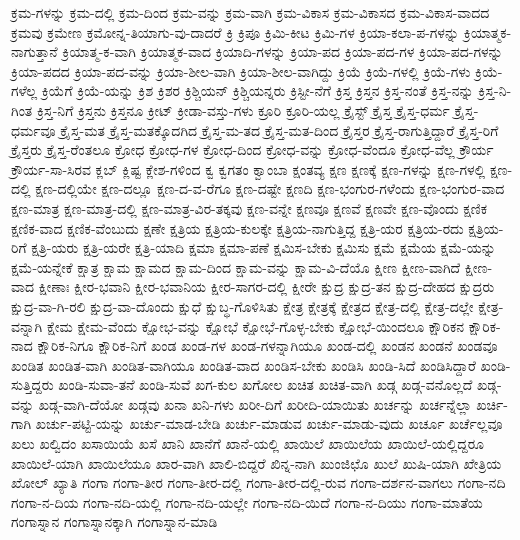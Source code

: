 {ಕ್ರಮ-ಗಳನ್ನು
ಕ್ರಮ-ದಲ್ಲಿ
ಕ್ರಮ-ದಿಂದ
ಕ್ರಮ-ವನ್ನು
ಕ್ರಮ-ವಾಗಿ
ಕ್ರಮ-ವಿಕಾಸ
ಕ್ರಮ-ವಿಕಾಸದ
ಕ್ರಮ-ವಿಕಾಸ-ವಾದದ
ಕ್ರಮವು
ಕ್ರಮೇಣ
ಕ್ರಮೋನ್ನ-ತಿಯಾಗು-ವು-ದಾದರೆ
ಕ್ರಿ
ಕ್ರಿಪೂ
ಕ್ರಿಮಿ-ಕೀಟ
ಕ್ರಿಮಿ-ಗಳ
ಕ್ರಿಯಾ-ಕಲಾ-ಪ-ಗಳನ್ನು
ಕ್ರಿಯಾತ್ಮಕ-ನಾಗುತ್ತಾನೆ
ಕ್ರಿಯಾತ್ಮ-ಕ-ವಾಗಿ
ಕ್ರಿಯಾತ್ಮಕ-ವಾದ
ಕ್ರಿಯಾದಿ-ಗಳನ್ನು
ಕ್ರಿಯಾ-ಪದ
ಕ್ರಿಯಾ-ಪದ-ಗಳ
ಕ್ರಿಯಾ-ಪದ-ಗಳನ್ನು
ಕ್ರಿಯಾ-ಪದದ
ಕ್ರಿಯಾ-ಪದ-ವನ್ನು
ಕ್ರಿಯಾ-ಶೀಲ-ವಾಗಿ
ಕ್ರಿಯಾ-ಶೀಲ-ವಾಗಿದ್ದು
ಕ್ರಿಯೆ
ಕ್ರಿಯೆ-ಗಳಲ್ಲಿ
ಕ್ರಿಯೆ-ಗಳು
ಕ್ರಿಯೆ-ಗಳೆಲ್ಲ
ಕ್ರಿಯೆಗೆ
ಕ್ರಿಯೆ-ಯನ್ನು
ಕ್ರಿಶ
ಕ್ರಿಶರ
ಕ್ರಿಶ್ಚಿಯನ್
ಕ್ರಿಶ್ಚಿಯನ್ನರು
ಕ್ರಿಸ್ಟೀ-ನೆಗೆ
ಕ್ರಿಸ್ತ
ಕ್ರಿಸ್ತನ
ಕ್ರಿಸ್ತ-ನಂತೆ
ಕ್ರಿಸ್ತ-ನನ್ನು
ಕ್ರಿಸ್ತ-ನಿ-ಗಿಂತ
ಕ್ರಿಸ್ತ-ನಿಗೆ
ಕ್ರಿಸ್ತನು
ಕ್ರಿಸ್ತನೂ
ಕ್ರೀಟ್
ಕ್ರೀಡಾ-ವಸ್ತು-ಗಳು
ಕ್ರೂರಿ
ಕ್ರೂರಿ-ಯಲ್ಲ
ಕ್ರೈಸ್ಟ್
ಕ್ರೈಸ್ತ
ಕ್ರೈಸ್ತ-ಧರ್ಮ
ಕ್ರೈಸ್ತ-ಧರ್ಮವೂ
ಕ್ರೈಸ್ತ-ಮತ
ಕ್ರೈಸ್ತ-ಮತಕ್ಕೊದಗಿದ
ಕ್ರೈಸ್ತ-ಮ-ತದ
ಕ್ರೈಸ್ತ-ಮತ-ದಿಂದ
ಕ್ರೈಸ್ತರ
ಕ್ರೈಸ್ತ-ರಾಗುತ್ತಿದ್ದಾರೆ
ಕ್ರೈಸ್ತ-ರಿಗೆ
ಕ್ರೈಸ್ತರು
ಕ್ರೈಸ್ತ-ರೆಂತಲೂ
ಕ್ರೋಧ
ಕ್ರೋಧ-ಗಳ
ಕ್ರೋಧ-ದಿಂದ
ಕ್ರೋಧ-ವನ್ನು
ಕ್ರೋಧ-ವೆಂದೂ
ಕ್ರೋಧ-ವೆಲ್ಲ
ಕ್ರೌರ್ಯ
ಕ್ರೌರ್ಯ-ಸಾ-ಸಿರವ
ಕ್ಲಬ್
ಕ್ಲಿಷ್ಟ
ಕ್ಲೇಶ-ಗಳಿಂದ
ಕ್ವ
ಕ್ವಗತಂ
ಕ್ವಾಂಬಾ
ಕ್ಷಂತವ್ಯ
ಕ್ಷಣ
ಕ್ಷಣಕ್ಕೆ
ಕ್ಷಣ-ಗಳನ್ನು
ಕ್ಷಣ-ಗಳಲ್ಲಿ
ಕ್ಷಣ-ದಲ್ಲಿ
ಕ್ಷಣ-ದಲ್ಲಿಯೇ
ಕ್ಷಣ-ದಲ್ಲೂ
ಕ್ಷಣ-ದ-ವ-ರೆಗೂ
ಕ್ಷಣ-ದಷ್ಟೇ
ಕ್ಷಣದಿ
ಕ್ಷಣ-ಭಂಗುರ-ಗಳೆಂದು
ಕ್ಷಣ-ಭಂಗುರ-ವಾದ
ಕ್ಷಣ-ಮಾತ್ರ
ಕ್ಷಣ-ಮಾತ್ರ-ದಲ್ಲಿ
ಕ್ಷಣ-ಮಾತ್ರ-ವಿರ-ತಕ್ಕವು
ಕ್ಷಣ-ವನ್ನೇ
ಕ್ಷಣವೂ
ಕ್ಷಣವೆ
ಕ್ಷಣವೇ
ಕ್ಷಣ-ವೊಂದು
ಕ್ಷಣಿಕ
ಕ್ಷಣಿಕ-ವಾದ
ಕ್ಷಣಿಕ-ವೆಂಬುದು
ಕ್ಷಣೇ
ಕ್ಷತ್ರಿಯ
ಕ್ಷತ್ರಿಯ-ಕುಲಕ್ಕೇ
ಕ್ಷತ್ರಿಯ-ನಾಗುತ್ತಿದ್ದ
ಕ್ಷತ್ರಿ-ಯರ
ಕ್ಷತ್ರಿಯ-ರದು
ಕ್ಷತ್ರಿಯ-ರಿಗೆ
ಕ್ಷತ್ರಿ-ಯರು
ಕ್ಷತ್ರಿ-ಯರೇ
ಕ್ಷತ್ರಿ-ಯಾದಿ
ಕ್ಷಮಾ
ಕ್ಷಮಾ-ಪಣೆ
ಕ್ಷಮಿಸ-ಬೇಕು
ಕ್ಷಮಿಸು
ಕ್ಷಮೆ
ಕ್ಷಮೆಯ
ಕ್ಷಮೆ-ಯನ್ನು
ಕ್ಷಮೆ-ಯನ್ನೇಕೆ
ಕ್ಷಾತ್ರ
ಕ್ಷಾಮ
ಕ್ಷಾಮದ
ಕ್ಷಾಮ-ದಿಂದ
ಕ್ಷಾಮ-ವನ್ನು
ಕ್ಷಾಮ-ವಿ-ದೆಯೊ
ಕ್ಷೀಣ
ಕ್ಷೀಣ-ವಾಗಿದೆ
ಕ್ಷೀಣ-ವಾದ
ಕ್ಷೀಣಾಃ
ಕ್ಷೀರ-ಭವಾನಿ
ಕ್ಷೀರ-ಭವಾನಿಯ
ಕ್ಷೀರ-ಸಾಗರ-ದಲ್ಲಿ
ಕ್ಷೀರೇ
ಕ್ಷುದ್ರ
ಕ್ಷುದ್ರ-ತನ
ಕ್ಷುದ್ರ-ದೇಹದ
ಕ್ಷುದ್ರರು
ಕ್ಷುದ್ರ-ವಾ-ಗಿ-ರಲಿ
ಕ್ಷುದ್ರ-ವಾ-ದೊಂದು
ಕ್ಷುಧೆ
ಕ್ಷುಬ್ಧ-ಗೊಳಿಸಿತು
ಕ್ಷೇತ್ರ
ಕ್ಷೇತ್ರಕ್ಕೆ
ಕ್ಷೇತ್ರದ
ಕ್ಷೇತ್ರ-ದಲ್ಲಿ
ಕ್ಷೇತ್ರ-ದಲ್ಲೇ
ಕ್ಷೇತ್ರ-ವನ್ನಾಗಿ
ಕ್ಷೇಮ
ಕ್ಷೇಮ-ವೆಂದು
ಕ್ಷೋಭ-ವನ್ನು
ಕ್ಷೋಭೆ
ಕ್ಷೋಭೆ-ಗೊಳ್ಳ-ಬೇಕು
ಕ್ಷೋಭೆ-ಯಿಂದಲೂ
ಕ್ಷೌರಿಕನ
ಕ್ಷೌರಿಕ-ನಾದ
ಕ್ಷೌರಿಕ-ನಿಗೂ
ಕ್ಷೌರಿಕ-ನಿಗೆ
ಖಂಡ
ಖಂಡ-ಗಳ
ಖಂಡ-ಗಳನ್ನಾಗಿಯೂ
ಖಂಡ-ದಲ್ಲಿ
ಖಂಡನ
ಖಂಡನೆ
ಖಂಡವೂ
ಖಂಡಿತ
ಖಂಡಿತ-ವಾಗಿ
ಖಂಡಿತ-ವಾಗಿಯೂ
ಖಂಡಿತ-ವಾದ
ಖಂಡಿಸ-ಬೇಕು
ಖಂಡಿಸಿ
ಖಂಡಿ-ಸಿದೆ
ಖಂಡಿಸಿದ್ದಾರೆ
ಖಂಡಿ-ಸುತ್ತಿದ್ದರು
ಖಂಡಿ-ಸುವಾ-ತನೆ
ಖಂಡಿ-ಸುವೆ
ಖಗ-ಕುಲ
ಖಗೋಲ
ಖಚಿತ
ಖಚಿತ-ವಾಗಿ
ಖಡ್ಗ
ಖಡ್ಗ-ವನೊಲ್ಲದೆ
ಖಡ್ಗ-ವನ್ನು
ಖಡ್ಗ-ವಾಗಿ-ದೆಯೋ
ಖಡ್ಗವು
ಖನಾ
ಖನಿ-ಗಳು
ಖರೀ-ದಿಗೆ
ಖರೀದಿ-ಯಾಯಿತು
ಖರ್ಚನ್ನು
ಖರ್ಚನ್ನೆಲ್ಲಾ
ಖರ್ಚಿ-ಗಾಗಿ
ಖರ್ಚು-ಪಟ್ಟಿ-ಯನ್ನು
ಖರ್ಚು-ಮಾಡ-ಬೇಡಿ
ಖರ್ಚು-ಮಾಡುವ
ಖರ್ಚು-ಮಾಡು-ವುದು
ಖರ್ಚೂ
ಖರ್ಚೆಲ್ಲವೂ
ಖಲು
ಖಲ್ವಿದಂ
ಖಸಾಯಿಯೆ
ಖಸೆ
ಖಾನಿ
ಖಾನೆಗೆ
ಖಾನೆ-ಯಲ್ಲಿ
ಖಾಯಿಲೆ
ಖಾಯಿಲೆಯ
ಖಾಯಿಲೆ-ಯಲ್ಲಿದ್ದರೂ
ಖಾಯಿಲೆ-ಯಾಗಿ
ಖಾಯಿಲೆಯೂ
ಖಾರ-ವಾಗಿ
ಖಾಲಿ-ಬಿದ್ದರೆ
ಖಿನ್ನ-ನಾಗಿ
ಖುಂಜಿಛೊ
ಖುಲೆ
ಖುಷಿ-ಯಾಗಿ
ಖೇತ್ರಿಯ
ಖೋಲ್
ಖ್ಯಾತಿ
ಗಂಗಾ
ಗಂಗಾ-ತೀರ
ಗಂಗಾ-ತೀರ-ದಲ್ಲಿ
ಗಂಗಾ-ತೀರ-ದಲ್ಲಿ-ರುವ
ಗಂಗಾ-ದರ್ಶನ-ವಾಗಲು
ಗಂಗಾ-ನದಿ
ಗಂಗಾ-ನ-ದಿಯ
ಗಂಗಾ-ನದಿ-ಯಲ್ಲಿ
ಗಂಗಾ-ನದಿ-ಯಲ್ಲೇ
ಗಂಗಾ-ನದಿ-ಯಿದೆ
ಗಂಗಾ-ನ-ದಿಯು
ಗಂಗಾ-ಮಾತೆಯ
ಗಂಗಾಸ್ನಾನ
ಗಂಗಾಸ್ನಾನಕ್ಕಾಗಿ
ಗಂಗಾಸ್ನಾನ-ಮಾಡಿ
}
